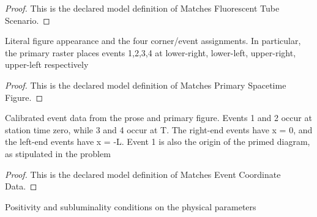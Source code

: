 \begin{proof}
  This is the declared model definition of Matches Fluorescent Tube Scenario.
\end{proof}
\begin{definition}
  \label{def:physics:phyx-mini-0610:phyxminiproblems-problemphyxmini0610-matchesprimaryspacetimefigure}
  Literal figure appearance and the four corner/event assignments. In particular, the primary raster places events 1,2,3,4 at lower-right, lower-left, upper-right, upper-left respectively
\end{definition}
\begin{proof}
  This is the declared model definition of Matches Primary Spacetime Figure.
\end{proof}
\begin{definition}
  \label{def:physics:phyx-mini-0610:phyxminiproblems-problemphyxmini0610-matcheseventcoordinatedata}
  Calibrated event data from the prose and primary figure. Events 1 and 2 occur at station time zero, while 3 and 4 occur at T. The right-end events have x = 0, and the left-end events have x = -L. Event 1 is also the origin of the primed diagram, as stipulated in the problem
\end{definition}
\begin{proof}
  This is the declared model definition of Matches Event Coordinate Data.
\end{proof}
\begin{definition}
  \label{def:physics:phyx-mini-0610:phyxminiproblems-problemphyxmini0610-hasphysicalparameters}
  Positivity and subluminality conditions on the physical parameters
\end{definition}
